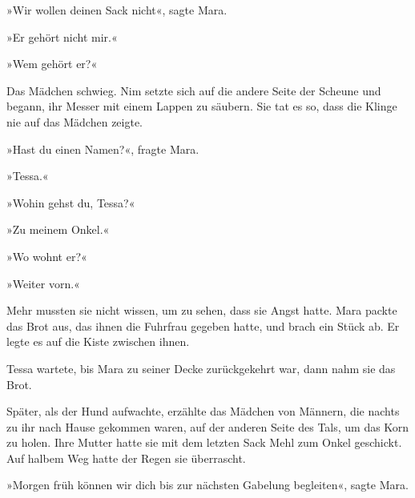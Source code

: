 \documentclass[10pt,a4paper]{article}
\begin{document}
»Wir wollen deinen Sack nicht«, sagte Mara.

»Er gehört nicht mir.«

»Wem gehört er?«

Das Mädchen schwieg. Nim setzte sich auf die andere Seite der Scheune und begann, ihr Messer mit einem Lappen zu säubern. Sie tat es so, dass die Klinge nie auf das Mädchen zeigte.

»Hast du einen Namen?«, fragte Mara.

»Tessa.«

»Wohin gehst du, Tessa?«

»Zu meinem Onkel.«

»Wo wohnt er?«

»Weiter vorn.«

Mehr mussten sie nicht wissen, um zu sehen, dass sie Angst hatte. Mara packte das Brot aus, das ihnen die Fuhrfrau gegeben hatte, und brach ein Stück ab. Er legte es auf die Kiste zwischen ihnen.

Tessa wartete, bis Mara zu seiner Decke zurückgekehrt war, dann nahm sie das Brot.

Später, als der Hund aufwachte, erzählte das Mädchen von Männern, die nachts zu ihr nach Hause gekommen waren, auf der anderen Seite des Tals, um das Korn zu holen. Ihre Mutter hatte sie mit dem letzten Sack Mehl zum Onkel geschickt. Auf halbem Weg hatte der Regen sie überrascht.

»Morgen früh können wir dich bis zur nächsten Gabelung begleiten«, sagte Mara.
\end{document}
